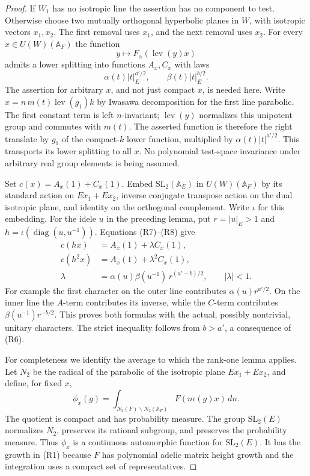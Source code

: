 \begin{proof}
If \(W_1\) has no isotropic line the assertion has no component
to test. Otherwise choose two mutually orthogonal hyperbolic
planes in \(W\), with isotropic vectors \(x_1,x_2\).
The first removal uses \(x_1\), and the next removal uses \(x_2\).
For every \(x\in U(W)(\mathbb A_F)\) the function
\[
           y\longmapsto
                 F_\alpha(\operatorname{lev}(y)x)
\]
admits a lower splitting into functions \(A_x,C_x\) with laws
\[
       \alpha(t)|t|_E^{a'/2},
       \qquad \beta(t)|t|_E^{b/2}.                \tag{R8}
 \label{eq:sr-two-step-lower-laws}
\]
The assertion for arbitrary \(x\), and not just compact \(x\),
is needed here. Write \(x=n\,m(t)\operatorname{lev}(g_1)k\)
by Iwasawa decomposition for the first line parabolic.
The first constant term is left \(n\)-invariant; \(\operatorname{lev}(y)\)
normalizes this unipotent group and commutes with \(m(t)\).
The asserted function is therefore the right translate by \(g_1\)
of the compact-\(k\) lower function, multiplied by
\(\alpha(t)|t|^{a'/2}\). This transports its lower splitting to
all \(x\). No polynomial test-space invariance under arbitrary
real group elements is being assumed.

Set \(c(x)=A_x(1)+C_x(1)\). Embed
\(\mathrm{SL}_2(\mathbb A_E)\) in \(U(W)(\mathbb A_F)\)
by its standard action on \(E x_1+E x_2\), inverse conjugate
transpose action on the dual isotropic plane, and identity on
the orthogonal complement. Write \(\iota\) for this embedding.
For the idele \(u\) in the preceding lemma, put \(r=|u|_E>1\)
and \(h=\iota(\operatorname{diag}(u,u^{-1}))\).
Equations (R7)--(R8) give
\[
 \begin{split}
 c(hx)&=A_x(1)+\lambda C_x(1),\\
 c(h^2x)&=A_x(1)+\lambda^2 C_x(1),\\
 \lambda&=\alpha(u)\beta(u^{-1})\,r^{(a'-b)/2},
                         \qquad |\lambda|<1.
 \end{split}                                      \tag{R9}
 \label{eq:sr-two-step-eigenvalue}
\]
For example the first character on the outer line contributes
\(\alpha(u)r^{a'/2}\). On the inner line the \(A\)-term contributes
its inverse, while the \(C\)-term contributes
\(\beta(u^{-1})r^{-b/2}\). This proves both formulas with the
actual, possibly nontrivial, unitary characters.
The strict inequality follows from \(b>a'\), a consequence of (R6).

For completeness we identify the average to which the rank-one
lemma applies. Let \(N_2\) be the radical of the parabolic of the
isotropic plane \(E x_1+E x_2\), and define, for fixed \(x\),
\[
 \phi_x(g)=\int_{N_2(F)\backslash N_2(\mathbb A_F)}
                         F(n\iota(g)x)\,dn .
\]
The quotient is compact and has probability measure.
The group \(\mathrm{SL}_2(E)\) normalizes \(N_2\), preserves
its rational subgroup, and preserves the probability measure.
Thus \(\phi_x\) is a continuous automorphic function for
\(\mathrm{SL}_2(E)\). It has the growth in (R1) because \(F\)
has polynomial adelic matrix height growth and the integration
uses a compact set of representatives.


\end{proof}
